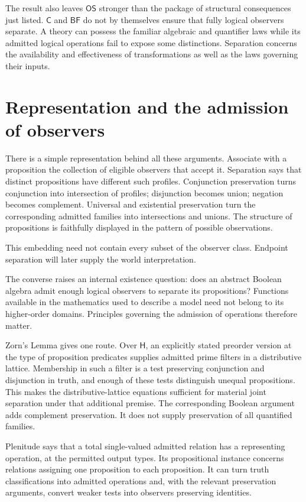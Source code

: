 \documentclass[12pt,letterpaper]{article}
\newcommand{\Hlogic}{\mathsf{H}}
\newcommand{\C}{\mathsf{C}}
\newcommand{\BF}{\mathsf{BF}}
\newcommand{\OS}{\mathsf{OS}}
\begin{document}
The result also leaves $\OS$ stronger than the package of structural consequences just listed. $\C$ and $\BF$ do not by themselves ensure that fully logical observers separate. A theory can possess the familiar algebraic and quantifier laws while its admitted logical operations fail to expose some distinctions. Separation concerns the availability and effectiveness of transformations as well as the laws governing their inputs.~\cite[\S7]{r9}


\section{Representation and the admission of observers}

There is a simple representation behind all these arguments. Associate with a proposition the collection of eligible observers that accept it. Separation says that distinct propositions have different such profiles. Conjunction preservation turns conjunction into intersection of profiles; disjunction becomes union; negation becomes complement. Universal and existential preservation turn the corresponding admitted families into intersections and unions. The structure of propositions is faithfully displayed in the pattern of possible observations.~\cite[\S2]{r2}


This embedding need not contain every subset of the observer class. Endpoint separation will later supply the world interpretation.


The converse raises an internal existence question: does an abstract Boolean algebra admit enough logical observers to separate its propositions? Functions available in the mathematics used to describe a model need not belong to its higher-order domains. Principles governing the admission of operations therefore matter.


Zorn's Lemma gives one route. Over $\Hlogic$, an explicitly stated preorder version at the type of proposition predicates supplies admitted prime filters in a distributive lattice. Membership in such a filter is a test preserving conjunction and disjunction in truth, and enough of these tests distinguish unequal propositions. This makes the distributive-lattice equations sufficient for material joint separation under that additional premise. The corresponding Boolean argument adds complement preservation. It does not supply preservation of all quantified families.~\cite{r7}


Plenitude says that a total single-valued admitted relation has a representing operation, at the permitted output types. Its propositional instance concerns relations assigning one proposition to each proposition. It can turn truth classifications into admitted operations and, with the relevant preservation arguments, convert weaker tests into observers preserving identities.
\end{document}
